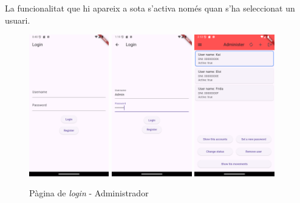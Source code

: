 \documentclass[a4paper,12pt,twoside]{ThesisStyle}
\begin{document}
La funcionalitat que hi apareix a sota s'activa només quan s'ha seleccionat un usuari.

\begin{figure}[h]
    \centering
    \includegraphics[width=0.31\textwidth]{imatges/login.png}
    \includegraphics[width=0.31\textwidth]{imatges/loginAdmin.png}
    \includegraphics[width=0.31\textwidth]{imatges/administer.png}
    \caption{Pàgina de \textit{login} - Administrador}
    \label{fig: Pàgina de login - Admin}
\end{figure}
\end{document}
